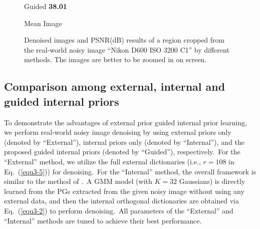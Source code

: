 \begin{figure}
{\begin{minipage}[t]{0.19\textwidth}
{\footnotesize Guided \textbf{38.01}}
\end{minipage}
\begin{minipage}[t]{0.19\textwidth}
\centering
{}
{\footnotesize Mean Image}
\end{minipage}
}\vspace{-3mm}
    \caption{Denoised images and PSNR(dB) results of a region cropped from the real-world noisy image ``Nikon D600 ISO 3200 C1'' \cite{crosschannel2016} by different methods. The images are better to be zoomed in on screen.}
    \label{fig3-8}
\end{figure}


\subsection{Comparison among external, internal and guided internal priors}

To demonstrate the advantages of external prior guided internal prior learning, we perform real-world noisy image denoising by using external priors only (denoted by ``External''), internal priors only (denoted by ``Internal''), and the proposed guided internal priors (denoted by ``Guided''), respectively.\ For the ``External'' method, we utilize the full external dictionaries (i.e., $r=108$ in Eq.\ (\ref{equ3-5})) for denoising.\ For the ``Internal'' method, the overall framework is similar to the method of \cite{ncsr}.\ A GMM model (with $K = 32$ Gaussians) is directly learned from the PGs extracted from the given noisy image without using any external data, and then the internal orthogonal dictionaries are obtained via Eq.\ (\ref{equ3-2}) to perform denoising.\ All parameters of the ``External'' and ``Internal'' methods are tuned to achieve their best performance. 

